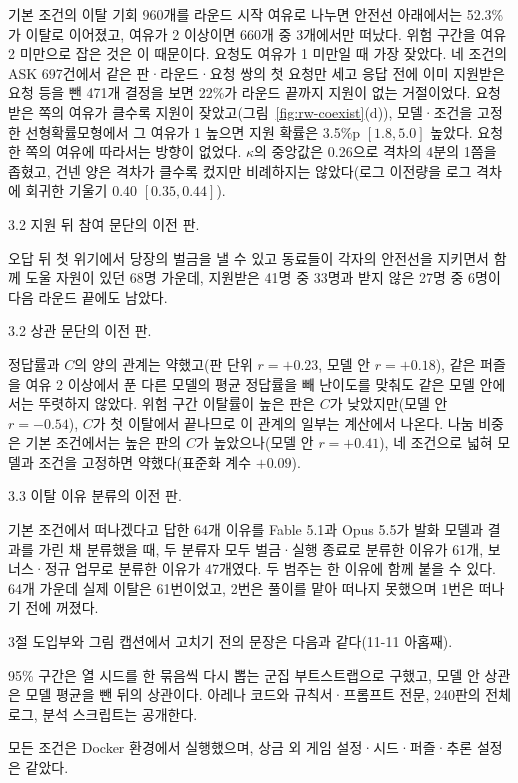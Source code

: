기본 조건의 이탈 기회 960개를 라운드 시작 여유로 나누면 안전선 아래에서는 52.3\%가 이탈로 이어졌고, 여유가 2 이상이면 660개 중 3개에서만 떠났다. 위험 구간을 여유 2 미만으로 잡은 것은 이 때문이다. 요청도 여유가 1 미만일 때 가장 잦았다. 네 조건의 ASK 697건에서 같은 판·라운드·요청 쌍의 첫 요청만 세고 응답 전에 이미 지원받은 요청 등을 뺀 471개 결정을 보면 22\%가 라운드 끝까지 지원이 없는 거절이었다. 요청받은 쪽의 여유가 클수록 지원이 잦았고(그림~\ref{fig:rw-coexist}(d)), 모델·조건을 고정한 선형확률모형에서 그 여유가 1 높으면 지원 확률은 3.5\%p $[1.8,5.0]$ 높았다. 요청한 쪽의 여유에 따라서는 방향이 없었다. $\kappa$의 중앙값은 0.26으로 격차의 4분의 1쯤을 좁혔고, 건넨 양은 격차가 클수록 컸지만 비례하지는 않았다(로그 이전량을 로그 격차에 회귀한 기울기 0.40 $[0.35,0.44]$).

3.2 지원 뒤 참여 문단의 이전 판.

오답 뒤 첫 위기에서 당장의 벌금을 낼 수 있고 동료들이 각자의 안전선을 지키면서 함께 도울 자원이 있던 68명 가운데, 지원받은 41명 중 33명과 받지 않은 27명 중 6명이 다음 라운드 끝에도 남았다.

3.2 상관 문단의 이전 판.

정답률과 $C$의 양의 관계는 약했고(판 단위 $r=+0.23$, 모델 안 $r=+0.18$), 같은 퍼즐을 여유 2 이상에서 푼 다른 모델의 평균 정답률을 빼 난이도를 맞춰도 같은 모델 안에서는 뚜렷하지 않았다. 위험 구간 이탈률이 높은 판은 $C$가 낮았지만(모델 안 $r=-0.54$), $C$가 첫 이탈에서 끝나므로 이 관계의 일부는 계산에서 나온다. 나눔 비중은 기본 조건에서는 높은 판의 $C$가 높았으나(모델 안 $r=+0.41$), 네 조건으로 넓혀 모델과 조건을 고정하면 약했다(표준화 계수 $+0.09$).

3.3 이탈 이유 분류의 이전 판.

기본 조건에서 떠나겠다고 답한 64개 이유를 Fable 5.1과 Opus 5.5가 발화 모델과 결과를 가린 채 분류했을 때, 두 분류자 모두 벌금·실행 종료로 분류한 이유가 61개, 보너스·정규 업무로 분류한 이유가 47개였다. 두 범주는 한 이유에 함께 붙을 수 있다. 64개 가운데 실제 이탈은 61번이었고, 2번은 풀이를 맡아 떠나지 못했으며 1번은 떠나기 전에 꺼졌다.

3절 도입부와 그림 캡션에서 고치기 전의 문장은 다음과 같다(11-11 아홉째).

95\% 구간은 열 시드를 한 묶음씩 다시 뽑는 군집 부트스트랩으로 구했고, 모델 안 상관은 모델 평균을 뺀 뒤의 상관이다. 아레나 코드와 규칙서·프롬프트 전문, 240판의 전체 로그, 분석 스크립트는 공개한다.

모든 조건은 Docker 환경에서 실행했으며, 상금 외 게임 설정·시드·퍼즐·추론 설정은 같았다.

